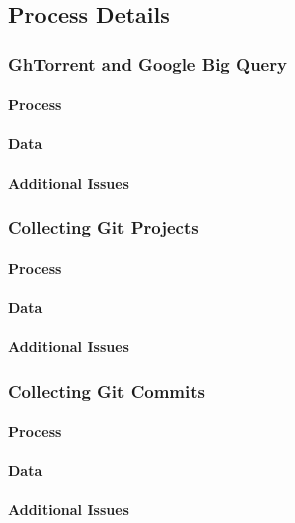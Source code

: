 \documentclass{article}
\begin{document}
\subsection{Process Details}

\subsubsection{GhTorrent and Google Big Query}

\paragraph{Process}
\paragraph{Data}
\paragraph{Additional Issues}

\subsubsection{Collecting Git Projects}

\paragraph{Process}
\paragraph{Data}
\paragraph{Additional Issues}

\subsubsection{Collecting Git Commits}

\paragraph{Process}
\paragraph{Data}
\paragraph{Additional Issues}
\end{document}
